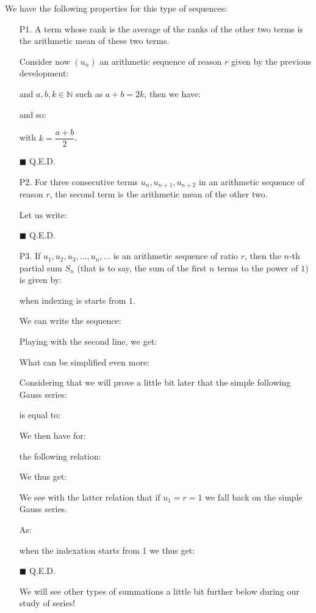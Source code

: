 	We have the following properties for this type of sequences:
	\begin{enumerate}
		\item[P1.] A term whose rank is the average of the ranks of the other two terms is the arithmetic mean of these two terms.
		\begin{dem}
		Consider now $(u_n)$ an arithmetic sequence of reason $r$ given by the previous development:
			
and $a,b,k \in \mathbb{N}$ such as $a+b=2k$, then we have:
			
and so:
		
with $k=\dfrac{a+b}{2}$.
		\begin{flushright}
			$\blacksquare$  Q.E.D.
		\end{flushright}
\end{dem}
	\item[P2.] For three consecutive terms $u_n,u_{n+1},u_{n+2}$ in an arithmetic sequence of reason $r$, the second term is the arithmetic mean of the other two.
		\begin{dem}
			Let us write:
				
				\begin{flushright}
					$\blacksquare$  Q.E.D.
				\end{flushright}
		\end{dem}
	\item[P3.] If $u_1,u_2,u_3,...,u_n,...$ is an arithmetic sequence of ratio $r$, then the $n$-th partial sum $S_n$ (that is to say, the sum of the first $n$ terms to the power of $1$) is given by:
		
when indexing is starts from $1$.
		\begin{dem}
			We can write the sequence:
				
		Playing with the second line, we get:
			
What can be simplified even more:
			
Considering that we will prove a little bit later that the simple following Gauss series:
			
is equal to:
			
We then have for:
			
the following relation:
			
We thus get:
			
We see with the latter relation that if $u_1=r=1$ we fall back on the simple Gauss series.

As:
			
when the indexation starts from 1 we thus get:
			
			\begin{flushright}
				$\blacksquare$  Q.E.D.
			\end{flushright}
		\end{dem}
We will see other types of summations a little bit further below during our study of series!
	\end{enumerate}
	
